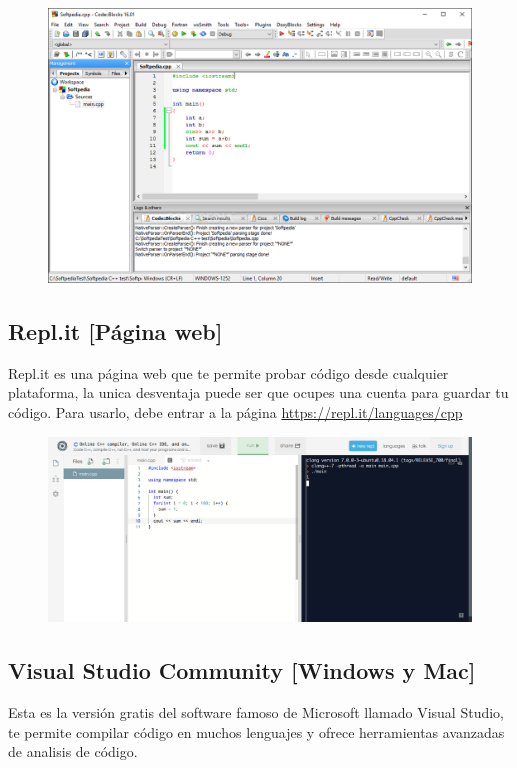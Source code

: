 \documentclass{article}
\begin{document}
\begin{figure}[H]
    \centering
    \includegraphics[width=0.5\paperwidth]{CodeBlocks}
\end{figure}

\subsection{Repl.it [Página web]}
Repl.it es una página web que te permite probar código desde cualquier plataforma, la unica desventaja puede ser que ocupes una cuenta para guardar tu código. Para usarlo, debe entrar a la página \url{https://repl.it/languages/cpp}

\begin{figure}[H]
    \centering
    \includegraphics[width=0.5\paperwidth]{replit}
\end{figure}

\subsection{Visual Studio Community [Windows y Mac]}
Esta es la versión gratis del software famoso de Microsoft llamado Visual Studio, te permite compilar código en muchos lenguajes y ofrece herramientas avanzadas de analisis de código.
\end{document}
